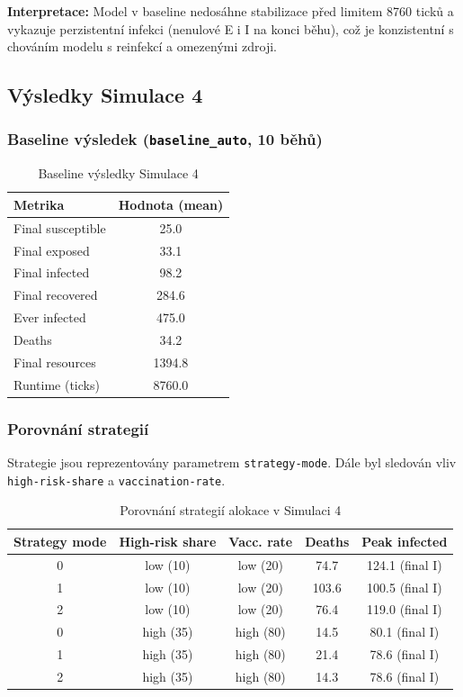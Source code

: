 \textbf{Interpretace:}  
Model v baseline nedosáhne stabilizace před limitem 8760 ticků a vykazuje perzistentní infekci (nenulové E i I na konci běhu), což je konzistentní s chováním modelu s reinfekcí a omezenými zdroji.

\subsection{Výsledky Simulace 4}

\subsubsection{Baseline výsledek (\texttt{baseline\_auto}, 10 běhů)}

\begin{table}[h]
\centering
\begin{tabular}{l c}
\hline
\textbf{Metrika} & \textbf{Hodnota (mean)} \\
\hline
Final susceptible & 25.0 \\
Final exposed & 33.1 \\
Final infected & 98.2 \\
Final recovered & 284.6 \\
Ever infected & 475.0 \\
Deaths & 34.2 \\
Final resources & 1394.8 \\
Runtime (ticks) & 8760.0 \\
\hline
\end{tabular}
\caption{Baseline výsledky Simulace 4}
\label{tab:s4_baseline}
\end{table}

\subsubsection{Porovnání strategií}

Strategie jsou reprezentovány parametrem \texttt{strategy-mode}. Dále byl sledován vliv \texttt{high-risk-share} a \texttt{vaccination-rate}.

\begin{table}[h]
\centering
\begin{tabular}{c c c c c}
\hline
\textbf{Strategy mode} & \textbf{High-risk share} & \textbf{Vacc. rate} & \textbf{Deaths} & \textbf{Peak infected} \\
\hline
0 & low (10) & low (20) & 74.7 & 124.1 (final I) \\
1 & low (10) & low (20) & 103.6 & 100.5 (final I) \\
2 & low (10) & low (20) & 76.4 & 119.0 (final I) \\
0 & high (35) & high (80) & 14.5 & 80.1 (final I) \\
1 & high (35) & high (80) & 21.4 & 78.6 (final I) \\
2 & high (35) & high (80) & 14.3 & 78.6 (final I) \\
\hline
\end{tabular}
\caption{Porovnání strategií alokace v Simulaci 4}
\label{tab:s4_strategy}
\end{table}

